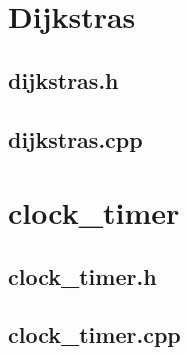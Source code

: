 \section{Dijkstras}
\label{app:dijkstras}
\subsection{dijkstras.h}
\label{app:dijkstras_h}

\bigskip
\bigskip

\subsection{dijkstras.cpp}
\label{app:dijkstras_cpp}

\bigskip
\bigskip


\section{clock\_timer}
\label{app:clock_timer}
\subsection{clock\_timer.h}
\label{app:clock_timer_h}

\bigskip
\bigskip

\subsection{clock\_timer.cpp}
\label{app:clock_timer_cpp}
